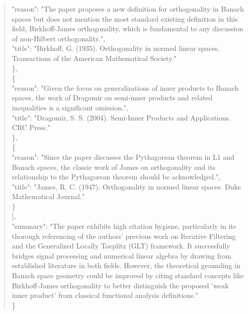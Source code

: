 \documentclass[11pt]{article}
\begin{document}
\begin{quote}
      "reason": "The paper proposes a new definition for orthogonality in Banach spaces but does not mention the most standard existing definition in this field, Birkhoff-James orthogonality, which is fundamental to any discussion of non-Hilbert orthogonality.",\\
      "title": "Birkhoff, G. (1935). Orthogonality in normed linear spaces. Transactions of the American Mathematical Society."\\
    \},\\
    \{\\
      "reason": "Given the focus on generalizations of inner products to Banach spaces, the work of Dragomir on semi-inner products and related inequalities is a significant omission.",\\
      "title": "Dragomir, S. S. (2004). Semi-Inner Products and Applications. CRC Press."\\
    \},\\
    \{\\
      "reason": "Since the paper discusses the Pythagorean theorem in L1 and Banach spaces, the classic work of James on orthogonality and its relationship to the Pythagorean theorem should be acknowledged.",\\
      "title": "James, R. C. (1947). Orthogonality in normed linear spaces. Duke Mathematical Journal."\\
    \}\\
  ],\\
  "summary": "The paper exhibits high citation hygiene, particularly in its thorough referencing of the authors' previous work on Iterative Filtering and the Generalized Locally Toeplitz (GLT) framework. It successfully bridges signal processing and numerical linear algebra by drawing from established literature in both fields. However, the theoretical grounding in Banach space geometry could be improved by citing standard concepts like Birkhoff-James orthogonality to better distinguish the proposed 'weak inner product' from classical functional analysis definitions."\\
\}\\
\end{quote}
\end{document}
